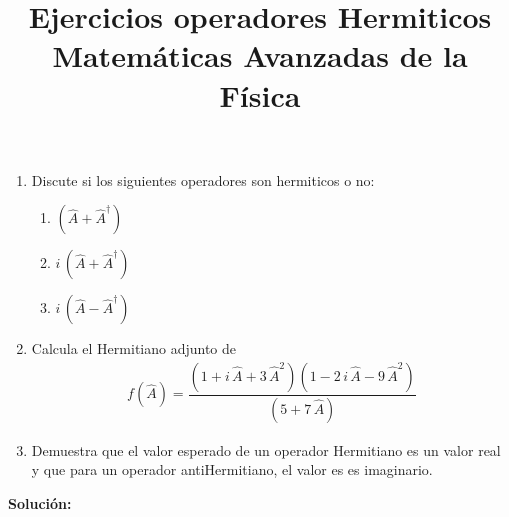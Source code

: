 
\title{Ejercicios operadores Hermiticos\\ \large {Matemáticas Avanzadas de la Física}  \vspace{-1.5\baselineskip}}
\date{}
\author{}

\maketitle
\fontsize{14}{14}\selectfont
\begin{enumerate}
\item Discute si los siguientes operadores son hermiticos o no:
\begin{enumerate}
\item $\left( \hat{A} + \hat{A}^{\dagger} \right)$
\item $i \, \left( \hat{A} + \hat{A}^{\dagger} \right)$
\item $i \, \left( \hat{A} - \hat{A}^{\dagger} \right)$
\end{enumerate}
\item Calcula el Hermitiano adjunto de
\begin{align*}
f(\hat{A}) = \dfrac{(1 + i \, \hat{A} + 3 \, \hat{A}^{2})(1 - 2 \, i \, \hat{A} - 9 \, \hat{A}^{2})}{(5 + 7 \, \hat{A})}
\end{align*}
\item Demuestra que el valor esperado de un operador Hermitiano es un valor real y que para un operador antiHermitiano, el valor es es imaginario.
\end{enumerate}
\textbf{Solución:}
